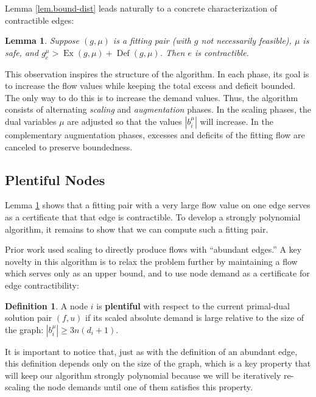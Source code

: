 \documentclass[11pt]{article}
\newtheorem{lemma}[theorem]{Lemma}
\theoremstyle{definition}
\newtheorem{definition}{Definition}[section]
\theoremstyle{definition}
\theoremstyle{definition}
\newcommand{\biu}{b_{i}^{\mu}}
\DeclareMathOperator{\Ex}{Ex}
\DeclareMathOperator{\Def}{Def}
\begin{document}
    Lemma \ref{lem.bound-dist} leads naturally to a concrete characterization of contractible edges:
    \begin{lemma} \label{lem.contractibility}
    Suppose $(g, \mu)$ is a fitting pair (with $g$ not necessarily feasible),
    $\mu$ is safe, and $g^\mu_e > \Ex(g, \mu) + \Def(g, \mu)$.
    Then $e$ is contractible.
    \end{lemma}
    
    This observation inspires the structure of the algorithm. In each phase, its
    goal is to increase the flow values while keeping the total excess and deficit
    bounded. The only way to do this is to increase the demand values. Thus, the algorithm
    consists of alternating \emph{scaling} and \emph{augmentation} phases. In the scaling phases, the
    dual variables $\mu$ are adjusted so that the values $|\biu|$ will increase. In the
    complementary augmentation phases, excesses and deficits of the fitting flow are
    canceled to preserve boundedness.

	\subsection{Plentiful Nodes}
    Lemma \ref{lem.contractibility} shows that a fitting pair with a very
    large flow value on one edge serves as a certificate that that edge is contractible.
    To develop a strongly polynomial algorithm, it remains to show that we can compute
    such a fitting pair.

    Prior work used scaling to directly produce flows with ``abundant edges.''
    A key novelty in this algorithm is to relax the problem further by maintaining
    a flow which serves only as an upper bound, and to use node demand as a certificate
    for edge contractibility:
    \begin{definition}
    A node $i$ is \textbf{plentiful} with respect
    to the current primal-dual solution pair $(f,u)$ if its scaled absolute
    demand is large relative to the size of the graph: $|b_i^{\mu}| \ge 3n(d_i + 1)$.
    \end{definition}

    It is important to notice that, just as with the definition of an abundant  edge,
    this definition depends only on the size of the graph, which is a key property
    that will keep our algorithm strongly polynomial because we will be iteratively
    re-scaling the node demands until one of them satisfies this property.
\end{document}
